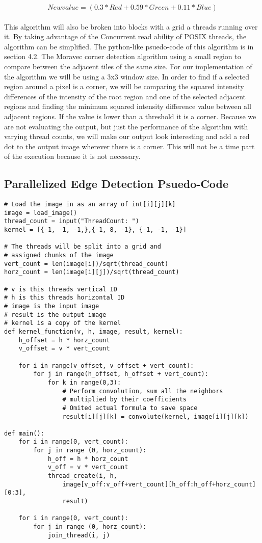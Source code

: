 \documentclass{article}
\begin{document}
        \[New value = (0.3*Red + 0.59*Green + 0.11*Blue)\]\\
        
        This algorithm will also be broken into blocks with a grid a threads running over it.  By taking advantage of the Concurrent read ability of POSIX threads, the algorithm can be simplified.  The python-like psuedo-code of this algorithm is in section 4.2.  The Moravec corner detection algorithm using a small region to compare between the adjacent tiles of the same size.  For our implementation of the algorithm we will be using a 3x3 window size.  In order to find if a selected region around a pixel is a corner, we will be comparing the squared intensity differences of the intensity of the root region and one of the selected adjacent regions and finding the minimum squared intensity difference value between all adjacent regions.  If the value is lower than a threshold it is a corner.  Because we are not evaluating the output, but just the performance of the algorithm with varying thread counts, we will make our output look interesting and add a red dot to the output image wherever there is a corner.  This will not be a time part of the execution because it is not necessary.
        \pagebreak
        
        \subsection{Parallelized Edge Detection Psuedo-Code}
        \begin{lstlisting}
# Load the image in as an array of int[i][j][k]
image = load_image()
thread_count = input("ThreadCount: ")
kernel = [{-1, -1, -1,},{-1, 8, -1}, {-1, -1, -1}]

# The threads will be split into a grid and 
# assigned chunks of the image
vert_count = len(image[i])/sqrt(thread_count)
horz_count = len(image[i][j])/sqrt(thread_count)

# v is this threads vertical ID
# h is this threads horizontal ID
# image is the input image
# result is the output image
# kernel is a copy of the kernel
def kernel_function(v, h, image, result, kernel):
    h_offset = h * horz_count
    v_offset = v * vert_count
    
    for i in range(v_offset, v_offset + vert_count):
        for j in range(h_offset, h_offset + vert_count):
            for k in range(0,3):
                # Perform convolution, sum all the neighbors 
                # multiplied by their coefficients
                # Omited actual formula to save space
                result[i][j][k] = convolute(kernel, image[i][j][k])

def main():
    for i in range(0, vert_count):
        for j in range (0, horz_count):
            h_off = h * horz_count
            v_off = v * vert_count
            thread_create(i, h, 
                image[v_off:v_off+vert_count][h_off:h_off+horz_count][0:3], 
                result)
                
    for i in range(0, vert_count):
        for j in range (0, horz_count):
            join_thread(i, j)

        \end{lstlisting}
        \pagebreak       
        
\end{document}

